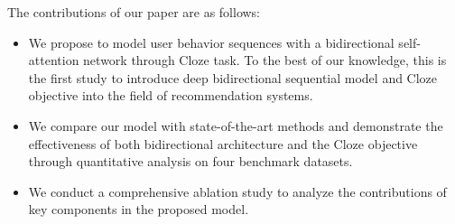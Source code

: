 The contributions of our paper are as follows:
\begin{itemize}%
    \item We propose to model user behavior sequences with a bidirectional self-attention network through Cloze task. To the best of our knowledge, this is the first study to introduce deep bidirectional sequential model and Cloze objective into the field of recommendation systems.
    \item We compare our model with state-of-the-art methods and demonstrate the effectiveness of both bidirectional architecture and the Cloze objective through quantitative analysis on four benchmark datasets.
    \item We conduct a comprehensive ablation study to analyze the contributions of key components in the proposed model. %
\end{itemize}



